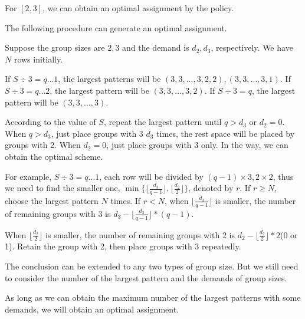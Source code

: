 \begin{lem}
For $[2,3]$, we can obtain an optimal assignment by the policy.
\end{lem}

The following procedure can generate an optimal assignment.



Suppose the group sizes are $2,3$ and the demand is $d_2,d_3$, respectively. We have $N$ rows initially.

If $S \div 3 = q \ldots 1$, the largest patterns will be $(3,3,\ldots,3,2,2), (3,3,\ldots,3,1)$. %
If $S \div 3 = q \ldots 2$, the largest pattern will be $(3,3,\ldots,3,2)$.
If $S \div 3 = q $, the largest pattern will be $(3,3,\ldots,3)$.

According to the value of $S$, repeat the largest pattern until $q > d_3$ or $d_2 =0$.
When $q > d_3$, just place groups with 3 $d_3$ times, the rest space will be placed by groups with 2. When $d_2 =0$, just place groups with 3 only.
In the way, we can obtain the optimal scheme.

For example, $S \div 3 = q \ldots 1$, each row will be divided by $(q-1)\times 3, 2\times 2$, thus we need to find the smaller one, $\min\{\lfloor\frac{d_3}{q-1}\rfloor, \lfloor\frac{d_2}{2}\rfloor \}$, denoted by $r$. If $r \geq N$, choose the largest pattern $N$ times. If $r< N$, when $\lfloor\frac{d_3}{q-1}\rfloor$ is smaller, the number of remaining groups with 3 is $d_3 - \lfloor\frac{d_3}{q-1}\rfloor * (q-1)$.

When $\lfloor\frac{d_2}{2}\rfloor$ is smaller, the number of remaining groups with 2 is $d_2 - \lfloor\frac{d_2}{2}\rfloor * 2$(0 or 1). Retain the group with 2, then place groups with 3 repeatedly.

The conclusion can be extended to any two types of group size. But we still need to consider the number of the largest pattern and the demands of group sizes.

As long as we can obtain the maximum number of the largest patterns with some demands, we will obtain an optimal assignment.

